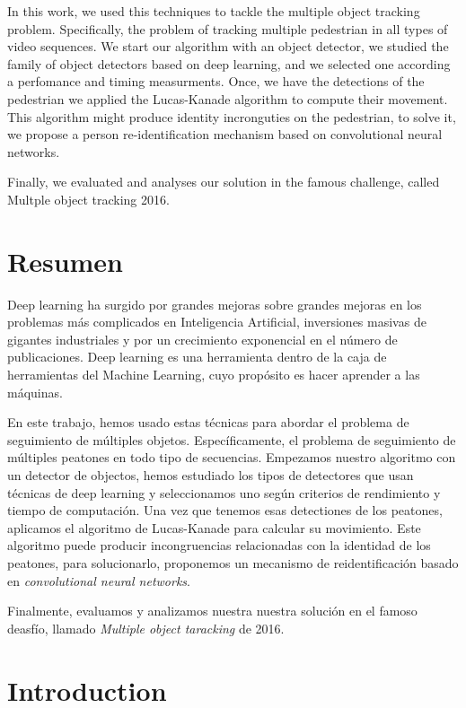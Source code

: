 \documentclass[12pt, a4paper, titlepage,twoside,openright]{article}
\begin{document}
In this work, we used this techniques to tackle the multiple object tracking problem. Specifically, the problem of tracking multiple pedestrian in all types of video sequences. We start our algorithm with an object detector, we studied the family of object detectors based on deep learning, and we selected one according a perfomance and timing measurments. Once, we have the detections of the pedestrian we applied the Lucas-Kanade algorithm to compute their movement. This algorithm might produce identity incronguties on the pedestrian, to solve it, we propose a person re-identification mechanism based on convolutional neural networks.

Finally, we evaluated and analyses our solution in the famous challenge, called Multple object tracking 2016.  


\section{Resumen}

Deep learning ha surgido por grandes mejoras sobre grandes mejoras en los problemas más complicados en Inteligencia Artificial, inversiones masivas de gigantes industriales y por un crecimiento exponencial en el número de publicaciones. Deep learning es una herramienta dentro de la caja de herramientas del Machine Learning, cuyo propósito es hacer aprender a las máquinas.

En este trabajo, hemos usado estas técnicas para abordar el problema de seguimiento de múltiples objetos. Específicamente, el problema de seguimiento de múltiples peatones en todo tipo de secuencias. Empezamos nuestro algoritmo con un detector de objectos, hemos estudiado los tipos de detectores que usan técnicas de deep learning y seleccionamos uno según criterios de rendimiento y tiempo de computación. Una vez que tenemos esas detectiones de los peatones, aplicamos el algoritmo de Lucas-Kanade para calcular su movimiento. Este algoritmo puede producir incongruencias relacionadas con la identidad de los peatones, para solucionarlo, proponemos un mecanismo de reidentificación basado en \textit{convolutional neural networks}.

Finalmente, evaluamos y analizamos nuestra nuestra solución en el famoso deasfío, llamado \textit{Multiple object taracking} de 2016.


\section{Introduction}
\end{document}
